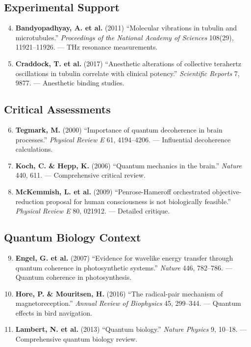 \subsection{Experimental Support}

\begin{enumerate}
\setcounter{enumi}{3}
\item \textbf{Bandyopadhyay, A. et al.} (2011) ``Molecular vibrations in tubulin and microtubules.'' \textit{Proceedings of the National Academy of Sciences} 108(29), 11921--11926. --- THz resonance measurements.

\item \textbf{Craddock, T. et al.} (2017) ``Anesthetic alterations of collective terahertz oscillations in tubulin correlate with clinical potency.'' \textit{Scientific Reports} 7, 9877. --- Anesthetic binding studies.
\end{enumerate}

\subsection{Critical Assessments}

\begin{enumerate}
\setcounter{enumi}{5}
\item \textbf{Tegmark, M.} (2000) ``Importance of quantum decoherence in brain processes.'' \textit{Physical Review E} 61, 4194--4206. --- Influential decoherence calculations.

\item \textbf{Koch, C. \& Hepp, K.} (2006) ``Quantum mechanics in the brain.'' \textit{Nature} 440, 611. --- Comprehensive critical review.

\item \textbf{McKemmish, L. et al.} (2009) ``Penrose-Hameroff orchestrated objective-reduction proposal for human consciousness is not biologically feasible.'' \textit{Physical Review E} 80, 021912. --- Detailed critique.
\end{enumerate}

\subsection{Quantum Biology Context}

\begin{enumerate}
\setcounter{enumi}{8}
\item \textbf{Engel, G. et al.} (2007) ``Evidence for wavelike energy transfer through quantum coherence in photosynthetic systems.'' \textit{Nature} 446, 782--786. --- Quantum coherence in photosynthesis.

\item \textbf{Hore, P. \& Mouritsen, H.} (2016) ``The radical-pair mechanism of magnetoreception.'' \textit{Annual Review of Biophysics} 45, 299--344. --- Quantum effects in bird navigation.

\item \textbf{Lambert, N. et al.} (2013) ``Quantum biology.'' \textit{Nature Physics} 9, 10--18. --- Comprehensive quantum biology review.
\end{enumerate}
